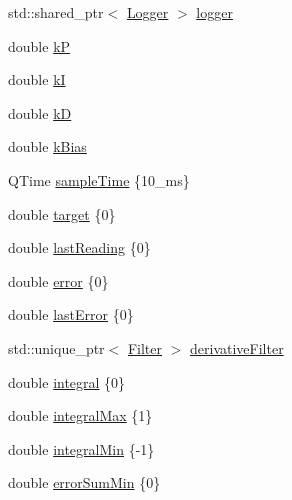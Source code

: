 \begin{DoxyCompactItemize}
\item 
std\+::shared\+\_\+ptr$<$ \mbox{\hyperlink{classokapi_1_1Logger}{Logger}} $>$ \mbox{\hyperlink{classokapi_1_1IterativePosPIDController_a8d102eed0557c04e1c59b759aa8fbcd6}{logger}}
\item 
double \mbox{\hyperlink{classokapi_1_1IterativePosPIDController_a707afeb73c11b00fb53784a8221fbe94}{kP}}
\item 
double \mbox{\hyperlink{classokapi_1_1IterativePosPIDController_a98520879b5b75344b98ef75561b74f66}{kI}}
\item 
double \mbox{\hyperlink{classokapi_1_1IterativePosPIDController_a50e35510eaaf9f273b0b7d1d27b8e494}{kD}}
\item 
double \mbox{\hyperlink{classokapi_1_1IterativePosPIDController_a67627d3b4d56a115812a4d3b52e10ff9}{k\+Bias}}
\item 
Q\+Time \mbox{\hyperlink{classokapi_1_1IterativePosPIDController_a336e78abe2cf481b2c8f7a389cdd26fb}{sample\+Time}} \{10\+\_\+ms\}
\item 
double \mbox{\hyperlink{classokapi_1_1IterativePosPIDController_a040f8b4e34511e33b41d1f25224c0da5}{target}} \{0\}
\item 
double \mbox{\hyperlink{classokapi_1_1IterativePosPIDController_a0dd811fb6ee7a75191b9d26bf1cd082b}{last\+Reading}} \{0\}
\item 
double \mbox{\hyperlink{classokapi_1_1IterativePosPIDController_a87682e04490754f69e922de57dda43bc}{error}} \{0\}
\item 
double \mbox{\hyperlink{classokapi_1_1IterativePosPIDController_aee05c8d81c9ad92a8cf8bd32cc8ca474}{last\+Error}} \{0\}
\item 
std\+::unique\+\_\+ptr$<$ \mbox{\hyperlink{classokapi_1_1Filter}{Filter}} $>$ \mbox{\hyperlink{classokapi_1_1IterativePosPIDController_a4c92203e64b3ebbda5660410904aa753}{derivative\+Filter}}
\item 
double \mbox{\hyperlink{classokapi_1_1IterativePosPIDController_aeb03bf7fa13e1c608c4a0a238846ce9a}{integral}} \{0\}
\item 
double \mbox{\hyperlink{classokapi_1_1IterativePosPIDController_a389846fb5a276111ac2fdb7009141b2f}{integral\+Max}} \{1\}
\item 
double \mbox{\hyperlink{classokapi_1_1IterativePosPIDController_a9be87c9081976f6960838d501985b191}{integral\+Min}} \{-\/1\}
\item 
double \mbox{\hyperlink{classokapi_1_1IterativePosPIDController_abb73178d63994e9d2a5ec42630d6fb11}{error\+Sum\+Min}} \{0\}

\end{DoxyCompactItemize}
